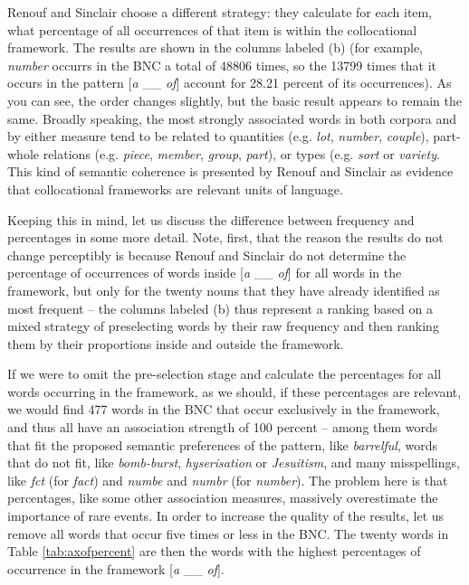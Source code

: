 Renouf and Sinclair choose a different strategy: they calculate for each item, what percentage of all occurrences of that item is within the collocational framework. The results are shown in the columns labeled (b) (for example, \textit{number} occurrs in the BNC a total of \num{48806} times, so the \num{13799} times that it occurs in the pattern [\textit{a} \_\_ \textit{of}] account for \num{28.21} percent of its occurrences). As you can see, the order changes slightly, but the basic result appears to remain the same. Broadly speaking, the most strongly associated words in both corpora and by either measure tend to be related to quantities (e.g. \textit{lot}, \textit{number}, \textit{couple}), part-whole relations (e.g. \textit{piece}, \textit{member}, \textit{group}, \textit{part}), or types (e.g. \textit{sort} or \textit{variety}. This kind of semantic coherence is presented by Renouf and Sinclair as evidence that collocational frameworks are relevant units of language.

Keeping this in mind, let us discuss the difference between frequency and percentages in some more detail. Note, first, that the reason the results do not change perceptibly is because Renouf and Sinclair do not determine the percentage of occurrences of words inside [\textit{a} \_\_ \textit{of}] for all words in the framework, but only for the twenty nouns that they have already identified as most frequent -- the columns labeled (b) thus represent a ranking based on a mixed strategy of preselecting words by their raw frequency and then ranking them by their proportions inside and outside the framework. 

If we were to omit the pre-selection stage and calculate the percentages for all words occurring in the framework, as we should, if these percentages are relevant, we would find 477 words in the BNC that occur exclusively in the framework, and thus all have an association strength of 100 percent -- among them words that fit the proposed semantic preferences of the pattern, like \textit{barrelful}, words that do not fit, like \textit{bomb-burst}, \textit{hyserisation} or \textit{Jesuitism}, and many misspellings, like \textit{fct} (for \textit{fact}) and \textit{numbe} and \textit{numbr} (for \textit{number}). The problem here is that percentages, like some other association measures, massively overestimate the importance of rare events. In order to increase the quality of the results, let us remove all words that occur five times or less in the BNC. The twenty words in Table \ref{tab:axofpercent} are then the words with the highest percentages of occurrence in the framework [\textit{a} \_\_ \textit{of}].

